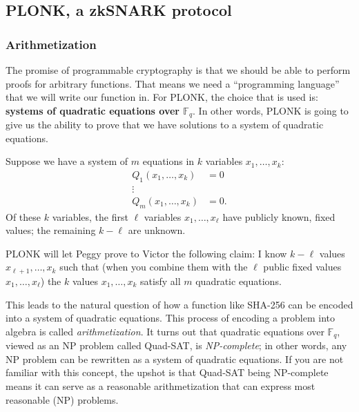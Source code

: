 \subsection{PLONK, a zkSNARK protocol}
\label{plonk}

\subsubsection{Arithmetization}
\label{arith-intro}

The promise of programmable cryptography is that we should be able to
perform proofs for arbitrary functions. That means we need a
``programming language'' that we will write our function in. For PLONK,
the choice that is used is: \textbf{systems of quadratic equations over
\({\mathbb{F}}_{q}\)}. In other words, PLONK is going to give us the
ability to prove that we have solutions to a system of quadratic
equations.

\begin{situation}
Suppose we have a system of \(m\) equations in \(k\) variables
\(x_{1},\ldots,x_{k}\): \[\begin{aligned}
Q_1\left( x_{1},\ldots,x_{k} \right) & = 0 \\
 \vdots \\
Q_{m}\left( x_{1},\ldots,x_{k} \right) & = 0.
\end{aligned}\] Of these \(k\) variables, the first \(\ell\) variables
\(x_{1},\ldots,x_{\ell}\) have publicly known, fixed values; the
remaining \(k - \ell\) are unknown.

PLONK will let Peggy prove to Victor the following claim: I know
\(k - \ell\) values \(x_{\ell + 1},\ldots,x_{k}\) such that (when you
combine them with the \(\ell\) public fixed values
\(x_{1},\ldots,x_{\ell}\)) the \(k\) values \(x_{1},\ldots,x_{k}\)
satisfy all \(m\) quadratic equations.
\end{situation}

This leads to the natural question of how a function like SHA-256 can be
encoded into a system of quadratic equations. This process of encoding a
problem into algebra is called \emph{arithmetization}. It turns out that
quadratic equations over \({\mathbb{F}}_{q}\), viewed as an NP problem
called Quad-SAT, is \emph{NP-complete}; in other words, any NP problem
can be rewritten as a system of quadratic equations. If you are not
familiar with this concept, the upshot is that Quad-SAT being
NP-complete means it can serve as a reasonable arithmetization that can
express most reasonable (NP) problems.

